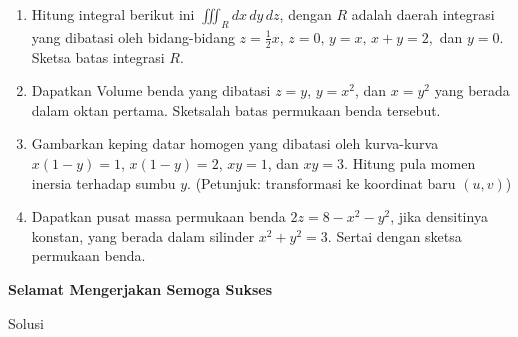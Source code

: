 \documentclass[11pt,a4paper]{article}
\begin{document}
\begin{enumerate}
  \item Hitung integral berikut ini $\iiint_R dx\,dy\,dz$, dengan $R$ adalah daerah integrasi yang dibatasi oleh bidang-bidang $z=\frac{1}{2}x,\, z=0,\, y=x,\, x+y=2,$ dan $y=0$. Sketsa batas integrasi $R$.
  \item Dapatkan Volume benda yang dibatasi $z=y$, $y=x^2$, dan $x=y^2$ yang berada dalam oktan pertama. Sketsalah batas permukaan benda tersebut.
  \item Gambarkan keping datar homogen yang dibatasi oleh kurva-kurva $x(1-y)=1$, $x(1-y)=2$, $xy=1$, dan $xy=3$. Hitung pula momen inersia terhadap sumbu $y$. (Petunjuk: transformasi ke koordinat baru $(u,v)$)
  \item Dapatkan pusat massa permukaan benda $2z=8-x^2-y^2$, jika densitinya konstan, yang berada dalam silinder $x^2+y^2=3$. Sertai dengan sketsa permukaan benda.
\end{enumerate}
\vspace*{1cm}
\begin{center}
  \textbf{Selamat Mengerjakan Semoga Sukses}
\end{center}
\newpage
{}
\fancyfoot[C]{}
\begin{center}
  Solusi
\end{center}
\end{document}
